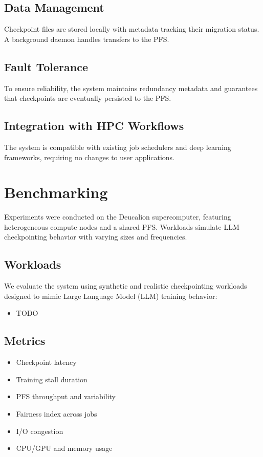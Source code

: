 \documentclass[conference,a4paper]{IEEEtran}
\begin{document}
\subsection{Data Management}

Checkpoint files are stored locally with metadata tracking their migration status. A background daemon handles transfers to the PFS.

\subsection{Fault Tolerance}

To ensure reliability, the system maintains redundancy metadata and guarantees that checkpoints are eventually persisted to the PFS.

\subsection{Integration with HPC Workflows}

The system is compatible with existing job schedulers and deep learning frameworks, requiring no changes to user applications.


\section{Benchmarking}

Experiments were conducted on the Deucalion supercomputer, featuring heterogeneous compute nodes and a shared PFS. Workloads simulate LLM checkpointing behavior with varying sizes and frequencies.

\subsection{Workloads}
We evaluate the system using synthetic and realistic checkpointing workloads designed to mimic Large Language Model (LLM) training behavior:
\begin{itemize}
    \item TODO
\end{itemize}

\subsection{Metrics}

\begin{itemize}
    \item Checkpoint latency
    \item Training stall duration
    \item PFS throughput and variability
    \item Fairness index across jobs
    \item I/O congestion
    \item CPU/GPU and memory usage
\end{itemize}
\end{document}
